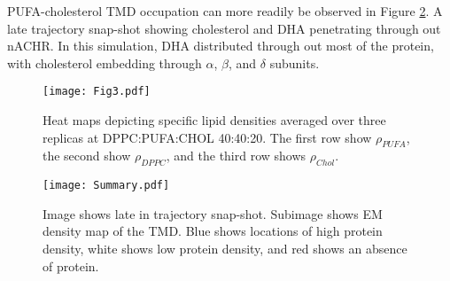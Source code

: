 	PUFA-cholesterol TMD occupation can more readily be observed in Figure \ref{fig:sum}. A late trajectory snap-shot showing cholesterol and DHA penetrating through out nACHR.  In this simulation,  DHA distributed through out most of the protein, with cholesterol embedding through $\alpha$, $\beta$, and $\delta$ subunits.


	\begin{figure}[h!]
		\center
		\texttt{[image: Fig3.pdf]}
		\caption{Heat maps depicting specific lipid densities averaged over three replicas at DPPC:PUFA:CHOL 40:40:20. The first row show $\rho_{PUFA}$, the second show $\rho_{DPPC}$, and the third row shows $\rho_{Chol}$. } 
		\label{fig:fig3}
	\end{figure}



	\begin{figure}[h!]
		\center
		\texttt{[image: Summary.pdf]}
		\caption{ Image shows late in trajectory snap-shot. Subimage shows EM density map of the TMD. Blue shows locations of high protein density, white shows low protein density, and red shows an absence of protein.} 
		\label{fig:sum}
	\end{figure}

	 